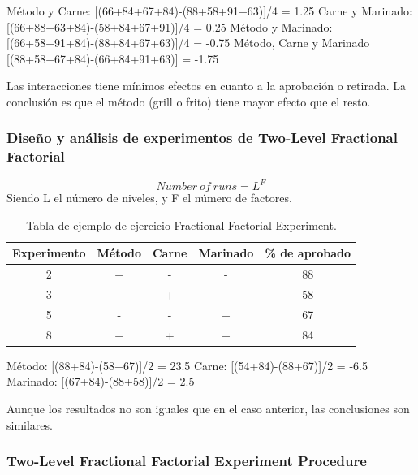 \documentclass[]{article}
\begin{document}
Método y Carne: [(66+84+67+84)-(88+58+91+63)]/4 = 1.25 \newline
Carne y Marinado: [(66+88+63+84)-(58+84+67+91)]/4 = 0.25 \newline
Método y Marinado: [(66+58+91+84)-(88+84+67+63)]/4 = -0.75 \newline
Método, Carne y Marinado [(88+58+67+84)-(66+84+91+63)] = -1.75 

Las interacciones tiene mínimos efectos en cuanto a la aprobación o retirada. La conclusión es que el método (grill o frito) tiene mayor efecto que el resto.

\subsubsection{Diseño y análisis de experimentos de Two-Level Fractional Factorial}
\begin{equation}
Number \ of \ runs = L^F
\end{equation}
Siendo L el número de niveles, y F el número de factores.

\begin{table}[H]
	\begin{center}
		\begin{tabular}{|c|c|c|c|c|}
			\hline Experimento & Método & Carne & Marinado & \% de aprobado \\ 
			\hline 2 & + & - & - & 88 \\ 
			\hline 3 & - & + & - & 58 \\ 
			\hline 5 & - & - & + & 67 \\ 
			\hline 8 & + & + & + & 84 \\ 
			\hline 
		\end{tabular} 
		\caption{Tabla de ejemplo de ejercicio Fractional Factorial Experiment.}
	\end{center}
\end{table}

Método: [(88+84)-(58+67)]/2 = 23.5 \newline
Carne: [(54+84)-(88+67)]/2 = -6.5 \newline
Marinado: [(67+84)-(88+58)]/2 = 2.5 

Aunque los resultados no son iguales que en el caso anterior, las conclusiones son similares.

\subsubsection{Two-Level Fractional Factorial Experiment Procedure}
\end{document}
